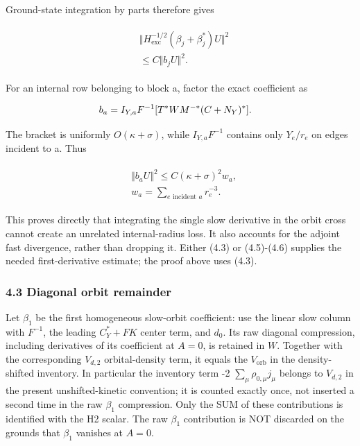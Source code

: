 Ground-state integration by parts therefore gives

\begin{gather*}
\begin{aligned}
& \Vert H_{\mathrm{exc}}^{-1/2}(\beta _{j}+\beta _{j}^{*})U\Vert ^{2} \\
& \le C\Vert b_{j}U\Vert ^{2}.
\end{aligned}\tag{4.5}
\end{gather*}

For an internal row belonging to block a, factor the exact coefficient
as

\begin{gather*}
\begin{aligned}
& b_{a}=I_{Y,a} F^{-1}[T^{*} W M^{-*}(C+N_{Y})^{*}].
\end{aligned}\notag
\end{gather*}

The bracket is uniformly \(O(\kappa +\sigma )\), while
\(I_{Y,a} F^{-1}\) contains only \(Y_{e}/r_{e}\) on edges incident to a.
Thus

\begin{gather*}
\begin{aligned}
& \Vert b_{a}U\Vert ^{2}\le C(\kappa +\sigma )^{2} w_{a}, \\
& w_{a}=\sum _{e \text{ incident } a}r_{e}^{-3}.
\end{aligned}\tag{4.6}
\end{gather*}

This proves directly that integrating the single slow derivative in the
orbit cross cannot create an unrelated internal-radius loss. It also
accounts for the adjoint fast divergence, rather than dropping it.
Either (4.3) or (4.5)-(4.6) supplies the needed first-derivative
estimate; the proof above uses (4.3).

\subsubsection{4.3 Diagonal orbit
remainder}\label{i-diagonal-orbit-remainder}

Let \(\beta _{1}\) be the first homogeneous slow-orbit coefficient: use
the linear slow column with \(F^{-1}\), the leading \(C_{Y}^{*}+FK\)
center term, and \(d_{0}\). Its raw diagonal compression, including
derivatives of its coefficient at \(A=0\), is retained in \(W\).
Together with the corresponding \(V_{d,2}\) orbital-density term, it
equals the \(V_{\mathrm{orb}}\) in the density-shifted inventory. In
particular the inventory term -2 \(\sum _{\mu} \rho _{0,\mu} j_{\mu}\)
belongs to \(V_{d,2}\) in the present unshifted-kinetic convention; it
is counted exactly once, not inserted a second time in the raw
\(\beta _{1}\) compression. Only the SUM of these contributions is
identified with the H2 scalar. The raw \(\beta _{1}\) contribution is
NOT discarded on the grounds that \(\beta _{1}\) vanishes at \(A=0\).

